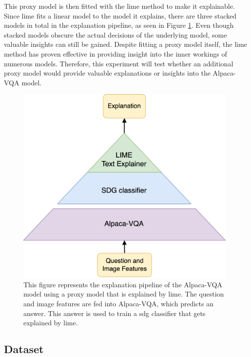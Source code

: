         This proxy model is then fitted with the \gls{lime} method to make it explainable. Since \gls{lime} fits a linear model to the model it explains, there are three stacked models in total in the explanation pipeline, as seen in Figure \ref{fig:LIMEpyramide}. 
        Even though stacked models obscure the actual decisions of the underlying model, some valuable insights can still be gained. 
        Despite fitting a proxy model itself, the \gls{lime} method has proven effective in providing insight into the inner workings of numerous models. Therefore, this experiment will test whether an additional proxy model would provide valuable explanations or insights into the Alpaca-VQA model. 
         

        \begin{figure}[htb]
            \centering
            \centerline{
            \includegraphics[width=11cm]
            {images/LIMEpyramide.png}}
            \caption{This figure represents the explanation pipeline of the Alpaca-VQA model using a proxy model that is explained by \gls{lime}. The question and image features are fed into Alpaca-VQA, which predicts an answer. This answer is used to train a \gls{sdg} classifier that gets explained by \gls{lime}.}
            \label{fig:LIMEpyramide}
        \end{figure}


        
        
        

    \subsection{Dataset}
        
